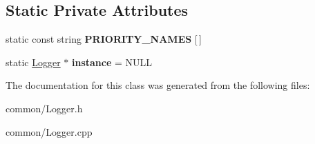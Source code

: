 \subsection*{Static Private Attributes}
\begin{DoxyCompactItemize}
\item 
\hypertarget{classLogger_af34a222ad5ec1399d6c529e0c4001b36}{static const string {\bfseries P\-R\-I\-O\-R\-I\-T\-Y\-\_\-\-N\-A\-M\-E\-S} \mbox{[}$\,$\mbox{]}}\label{classLogger_af34a222ad5ec1399d6c529e0c4001b36}

\item 
\hypertarget{classLogger_a5e9fd267cd621afeb1201131071425ea}{static \hyperlink{classLogger}{Logger} $\ast$ {\bfseries instance} = N\-U\-L\-L}\label{classLogger_a5e9fd267cd621afeb1201131071425ea}

\end{DoxyCompactItemize}


The documentation for this class was generated from the following files\-:\begin{DoxyCompactItemize}
\item 
common/Logger.\-h\item 
common/Logger.\-cpp\end{DoxyCompactItemize}
